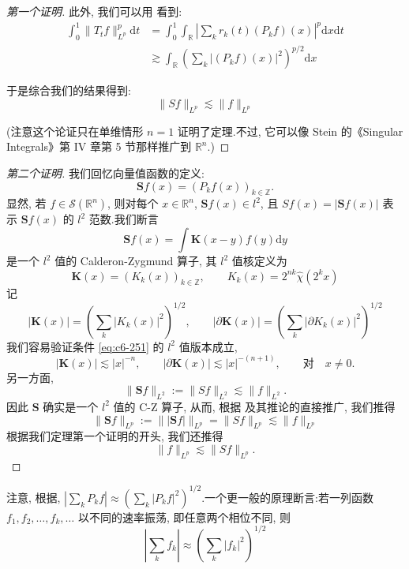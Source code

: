 \begin{proof}[第一个证明]
此外, 我们可以用 看到:
\[
\begin{array}{ll}
\int_0^1 \|T_t f\|^p_{L^p} \mathrm{d}t &= \int_0^1 \int_{\mathbb{R}} \left|\sum_k r_k(t) (P_k f)(x)\right|^p \mathrm{d}x \mathrm{d}t \\
&\gtrsim \int_{\mathbb{R}} \left(\sum_k |(P_k f)(x)|^2\right)^{p/2} \mathrm{d}x
\end{array}
\]

于是综合我们的结果得到:
\[
\|Sf\|_{L^p} \lesssim \|f\|_{L^p}
\]

(注意这个论证只在单维情形 $n = 1$ 证明了定理.不过, 它可以像 Stein 的《Singular Integrals》第 IV 章第 5 节那样推广到 $\mathbb{R}^n$.)
\end{proof}

\begin{proof}[第二个证明]
我们回忆向量值函数的定义:
\[
\mathbf{S} f(x) = (P_k f(x))_{k \in \mathbb{Z}}.
\]
显然, 若 $f \in \mathcal{S}(\mathbb{R}^n)$, 则对每个 $x \in \mathbb{R}^n$, $\mathbf{S} f(x) \in l^2$, 且 $Sf(x) = |\mathbf{S} f(x)|$ 表示 $\mathbf{S} f(x)$ 的 $l^2$ 范数.我们断言
\[
\mathbf{S} f(x) = \int \mathbf{K}(x-y) f(y) \mathrm{d}y
\]
是一个 $l^2$ 值的 Calderon-Zygmund 算子, 其 $l^2$ 值核定义为
\[
\mathbf{K}(x) = (K_k(x))_{k \in \mathbb{Z}}, \qquad K_k(x) = 2^{nk} \hat{\chi}(2^k x)
\]
记
\[
|\mathbf{K}(x)| = \left(\sum_k |K_k(x)|^2\right)^{1/2}, \qquad |\partial \mathbf{K}(x)| = \left(\sum_k |\partial K_k(x)|^2\right)^{1/2}
\]
我们容易验证条件 \eqref{eq:c6-251} 的 $l^2$ 值版本成立,
\begin{equation}
|\mathbf{K}(x)| \lesssim |x|^{-n}, \qquad |\partial \mathbf{K}(x)| \lesssim |x|^{-(n+1)}, \qquad \text{对} \quad x \neq 0.\label{eq:c6-266}
\end{equation}
另一方面,
\[
\|\mathbf{S} f\|_{L^2} := \|Sf\|_{L^2} \lesssim \|f\|_{L^2}.
\]
因此 $\mathbf{S}$ 确实是一个 $l^2$ 值的 C-Z 算子, 从而, 根据 及其推论的直接推广, 我们推得
\[
\|\mathbf{S} f\|_{L^p} := \||\mathbf{S} f|\|_{L^p} = \|Sf\|_{L^p} \lesssim \|f\|_{L^p}
\]
根据我们定理第一个证明的开头, 我们还推得
\[
\|f\|_{L^p} \lesssim \|Sf\|_{L^p}.
\]
\end{proof}

注意, 根据, $|\sum_k P_k f| \approx (\sum_k |P_k f|^2)^{1/2}$.一个更一般的原理断言:若一列函数 $f_1, f_2, \ldots, f_k, \ldots$ 以不同的速率振荡, 即任意两个相位不同, 则
\[
\left|\sum_k f_k\right| \approx \left(\sum_k |f_k|^2\right)^{1/2}
\]

